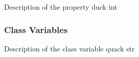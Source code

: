 \documentclass{article}
\begin{document}
      \begin{EpydocPropertyList}
                       {Description of the property duck}
                       {int}
                       {}
                       {}
                       {}
      \end{EpydocPropertyList}

    \subsubsection{Class Variables}

      \begin{EpydocClassVariableList}
                       {Description of the class variable quack}
                       {str} %
                       {}    %
      \end{EpydocClassVariableList}
\end{document}
